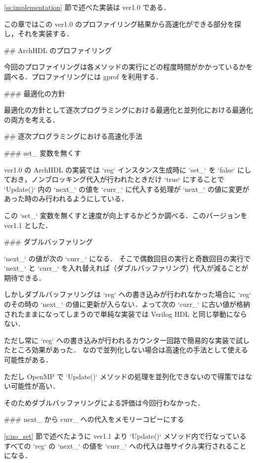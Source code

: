 \ref{ss:implementation} 節で述べた実装は ver1.0 である．

この章ではこの ver1.0 のプロファイリング結果から高速化ができる部分を探し，それを実装する．


## ArchHDL のプロファイリング

今回のプロファイリングは各メソッドの実行にどの程度時間がかかっているかを調べる．プロファイリングには
gprof を利用する．



### 最適化の方針

最適化の方針として逐次プログラミングにおける最適化と並列化における最適化の両方を考える．





## 逐次プログラミングにおける高速化手法




### set_ 変数を無くす \label{s:no_set}

ver1.0 の ArchHDL の実装では `reg` インスタンス生成時に `set_` を `false`
にしておき，ノンブロッキング代入が行われたときだけ `true` にすることで
`Update()` 内の `next_` の値を `curr_`
に代入する処理が `next_` の値に変更があった時のみ行われるようにしている．

この `set_` 変数を無くすと速度が向上するかどうか調べる．このバージョンを
ver1.1 とした．




### ダブルバッファリング

`next_` の値が次の `curr_` になる．
そこで偶数回目の実行と奇数回目の実行で `next_` と `curr_`
を入れ替えれば（ダブルバッファリング）代入が減ることが期待できる．

しかしダブルバッファリングは `reg` への書き込みが行われなかった場合に
`reg` のその時の `next_` の値に更新が入らない．よって次の
`curr_` に古い値が格納されたままになってしまうので単純な実装では Verilog HDL と同じ挙動にならない．

ただし常に `reg` への書き込みが行われるカウンター回路で簡易的な実装で試したところ効果があった．
なので並列化しない場合は高速化の手法として使える可能性がある．

ただし OpenMP で `Update()` メソッドの処理を並列化できないので得策ではない可能性が高い．

そのためダブルバッファリングによる評価は今回行わなかった．


### next_ から curr_ への代入をメモリーコピーにする

\ref{s:no_set} 節で述べたように ver1.1 より
`Update()` メソッド内で行なっているすべての `reg` の `next_`
の値を `curr_` への代入は毎サイクル実行されることになる．

